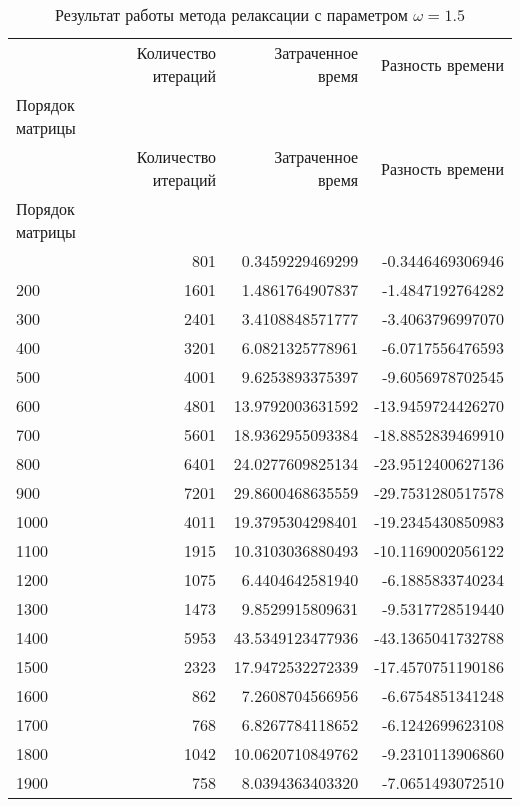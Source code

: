 \begin{longtable}{lrrr}
\caption{Результат работы метода релаксации с параметром $\omega=1.5$}\\
\toprule
 & Количество итераций & Затраченное время & Разность времени \\
Порядок матрицы &  &  &  \\
\midrule
\endfirsthead
\toprule
 & Количество итераций & Затраченное время & Разность времени \\
Порядок матрицы &  &  &  \\
\midrule
\endhead
\midrule
\midrule
\endfoot
\bottomrule
\endlastfoot
100 & 801 & 0.3459229469299 & -0.3446469306946 \\
200 & 1601 & 1.4861764907837 & -1.4847192764282 \\
300 & 2401 & 3.4108848571777 & -3.4063796997070 \\
400 & 3201 & 6.0821325778961 & -6.0717556476593 \\
500 & 4001 & 9.6253893375397 & -9.6056978702545 \\
600 & 4801 & 13.9792003631592 & -13.9459724426270 \\
700 & 5601 & 18.9362955093384 & -18.8852839469910 \\
800 & 6401 & 24.0277609825134 & -23.9512400627136 \\
900 & 7201 & 29.8600468635559 & -29.7531280517578 \\
1000 & 4011 & 19.3795304298401 & -19.2345430850983 \\
1100 & 1915 & 10.3103036880493 & -10.1169002056122 \\
1200 & 1075 & 6.4404642581940 & -6.1885833740234 \\
1300 & 1473 & 9.8529915809631 & -9.5317728519440 \\
1400 & 5953 & 43.5349123477936 & -43.1365041732788 \\
1500 & 2323 & 17.9472532272339 & -17.4570751190186 \\
1600 & 862 & 7.2608704566956 & -6.6754851341248 \\
1700 & 768 & 6.8267784118652 & -6.1242699623108 \\
1800 & 1042 & 10.0620710849762 & -9.2310113906860 \\
1900 & 758 & 8.0394363403320 & -7.0651493072510 \\
\end{longtable}
